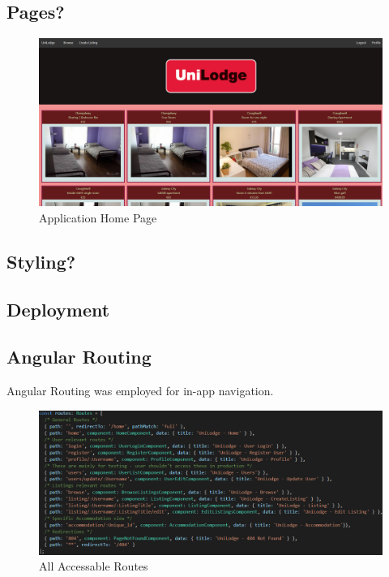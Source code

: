 \subsection{Pages?}

\begin{figure}[H]
	\caption{Application Home Page}
	\label{image:home}
	\centering
	\includegraphics[width=1\textwidth]{images/home.png}
\end{figure}	

\subsection{Styling?}
\subsection{Deployment}
\subsection{Angular Routing}
Angular Routing was employed for in-app navigation. 

\begin{figure}[H]
	\caption{All Accessable Routes}
	\label{image:routing}
	\centering
	\includegraphics[width=1\textwidth]{images/routes.png}
\end{figure}	
